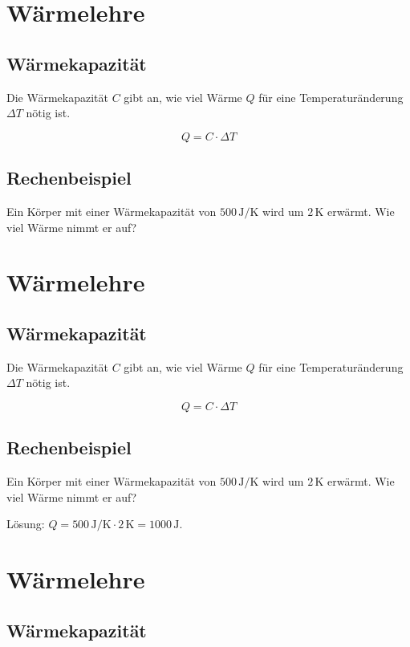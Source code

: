 \section{Wärmelehre}

\subsection{Wärmekapazität}

Die Wärmekapazität $C$ gibt an, wie viel Wärme $Q$ für eine Temperaturänderung
$\Delta T$ nötig ist.

\[
Q = C \cdot \Delta T
\]

\subsection{Rechenbeispiel}

Ein Körper mit einer Wärmekapazität von $500\,\mathrm{J/K}$ wird um
$2\,\mathrm{K}$ erwärmt. Wie viel Wärme nimmt er auf?



\section{Wärmelehre}

\subsection{Wärmekapazität}

Die Wärmekapazität $C$ gibt an, wie viel Wärme $Q$ für eine Temperaturänderung
$\Delta T$ nötig ist.

\[
Q = C \cdot \Delta T
\]

\subsection{Rechenbeispiel}

Ein Körper mit einer Wärmekapazität von $500\,\mathrm{J/K}$ wird um
$2\,\mathrm{K}$ erwärmt. Wie viel Wärme nimmt er auf?


Lösung: $Q = 500\,\mathrm{J/K} \cdot 2\,\mathrm{K} = 1000\,\mathrm{J}$.



\section{Wärmelehre}

\subsection{Wärmekapazität}

